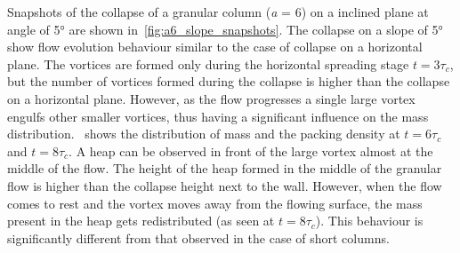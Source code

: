 \documentclass[epj,twocolumn]{webofc}
\begin{document}
Snapshots of the collapse of a granular column (\textit{a} = 6) on a inclined 
plane at angle of 5\si{\degree} are shown in~\cref{fig:a6_slope_snapshots}. 
The collapse on a slope of 5\si{\degree} show flow evolution behaviour similar 
to the case of collapse on a horizontal plane. The vortices are formed only 
during the horizontal spreading stage $t = 3\tau_c$, but the number of vortices 
formed during the collapse is higher than the collapse on a horizontal plane. 
However, as the flow progresses a single large vortex engulfs other smaller 
vortices, thus having a significant influence on the mass 
distribution.~ shows 
the distribution of mass and the packing density at $t = 6\tau_c$ and $t = 
8\tau_c$. A heap can be observed in front of the large vortex almost at the 
middle of the flow. The height of the heap formed in the middle of the granular 
flow is higher than the collapse height next to the wall. However, when the 
flow comes to rest and the vortex moves 
away from the flowing surface, the mass present in the heap gets redistributed 
(as seen at $t = 8\tau_c$). This behaviour is significantly different from that 
observed in the case of short columns. 
\end{document}
